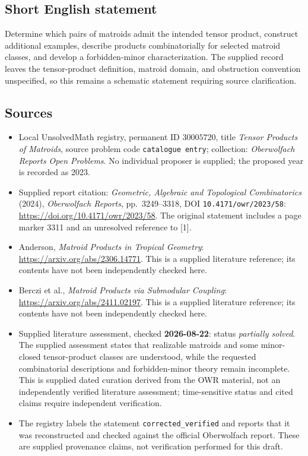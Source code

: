 \documentclass[11pt]{article}
\begin{document}
\subsection{Short English statement}
Determine which pairs of matroids admit the intended tensor product, construct additional examples, describe products combinatorially for selected matroid classes, and develop a forbidden-minor characterization. The supplied record leaves the tensor-product definition, matroid domain, and obstruction convention unspecified, so this remains a schematic statement requiring source clarification.
\subsection{Sources}
\begin{itemize}
\item Local UnsolvedMath registry, permanent ID \(30005720\), title \emph{Tensor Products of Matroids}, source problem code \texttt{catalogue entry}; collection: \emph{Oberwolfach Reports Open Problems}. No individual proposer is supplied; the proposed year is recorded as 2023.
\item Supplied report citation: \emph{Geometric, Algebraic and Topological Combinatorics} (2024), \emph{Oberwolfach Reports}, pp.\ 3249--3318, DOI \texttt{10.4171/owr/2023/58}: \url{https://doi.org/10.4171/owr/2023/58}. The original statement includes a page marker 3311 and an unresolved reference to [1].
\item Anderson, \emph{Matroid Products in Tropical Geometry}: \url{https://arxiv.org/abs/2306.14771}. This is a supplied literature reference; its contents have not been independently checked here.
\item Berczi et al., \emph{Matroid Products via Submodular Coupling}: \url{https://arxiv.org/abs/2411.02197}. This is a supplied literature reference; its contents have not been independently checked here.
\item Supplied literature assessment, checked \textbf{2026-08-22}: status \emph{partially solved}. The supplied assessment states that realizable matroids and some minor-closed tensor-product classes are understood, while the requested combinatorial descriptions and forbidden-minor theory remain incomplete. This is supplied dated curation derived from the OWR material, not an independently verified literature assessment; time-sensitive status and cited claims require independent verification.
\item The registry labels the statement \texttt{corrected\_verified} and reports that it was reconstructed and checked against the official Oberwolfach report. These are supplied provenance claims, not verification performed for this draft.
\end{itemize}
\end{document}
